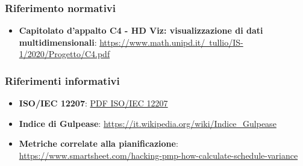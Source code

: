         \subsubsection{Riferimento normativi}
            \begin{itemize}
                \item \textbf{Capitolato d'appalto C4 - HD Viz: visualizzazione di dati multidimensionali}:
                \href{https://www.math.unipd.it/~tullio/IS-1/2020/Progetto/C4.pdf}{https://www.math.unipd.it/~tullio/IS-1/2020/Progetto/C4.pdf}
            \end{itemize}
            
        \subsubsection{Riferimenti informativi}
            \begin{itemize}
                \item \textbf{ISO/IEC 12207}:
                \href{https://www.math.unipd.it/~tullio/IS-1/2009/Approfondimenti/ISO_12207-1995.pdf}{PDF ISO/IEC 12207}
                \item \textbf{Indice di Gulpease}:
                \href{https://it.wikipedia.org/wiki/Indice_Gulpease}{https://it.wikipedia.org/wiki/Indice_Gulpease}
                \item \textbf{Metriche correlate alla pianificazione}:
                \href{https://www.smartsheet.com/hacking-pmp-how-calculate-schedule-variance}{https://www.smartsheet.com/hacking-pmp-how-calculate-schedule-variance}
            \end{itemize}